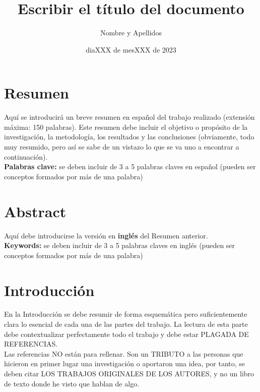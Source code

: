 \documentclass[11pt,a4paper,spanish]{book}
\title{Escribir el título del documento}
\author{Nombre y Apellidos}
\date{diaXXX de mesXXX de 2023}
\begin{document}
\renewcommand{\listfigurename}{Índice de figuras}
\renewcommand{\listtablename}{Índice de tablas}
\renewcommand{\contentsname}{Índice de contenidos}
\renewcommand{\figurename}{Figura}
\renewcommand{\tablename}{Tabla} 

\maketitle

\frontmatter
\tableofcontents
\listoffigures %
\listoftables %

\chapter{Resumen}
Aquí se introducirá un breve resumen en español del trabajo realizado (extensión máxima: 150 palabras). Este resumen debe incluir el objetivo o propósito de la investigación, la metodología, los resultados y las conclusiones (obviamente, todo muy resumido, pero así se sabe de un vistazo lo que se va uno a encontrar a continuación).\\


{\bf Palabras clave:} se deben incluir de 3 a 5 palabras claves en español (pueden ser conceptos formados por más de una palabra)

\chapter{Abstract}
Aquí debe introducirse la versión en {\bf inglés} del Resumen anterior.\\


{\bf Keywords:} se deben incluir de 3 a 5 palabras claves en inglés  (pueden ser conceptos formados por más de una palabra)




\mainmatter
\chapter{Introducción}

En la Introducción se debe resumir de forma esquemática pero suficientemente clara lo esencial de cada una de las partes del trabajo. La lectura de esta parte debe contextualizar perfectamente todo el trabajo y debe estar PLAGADA DE REFERENCIAS.\\

Las referencias NO están para rellenar. Son un TRIBUTO a las personas que hicieron en primer lugar una investigación o aportaron una idea, por tanto, se deben citar LOS TRABAJOS ORIGINALES DE LOS AUTORES, y no un libro de texto donde he visto que hablan de algo.\\
\end{document}
